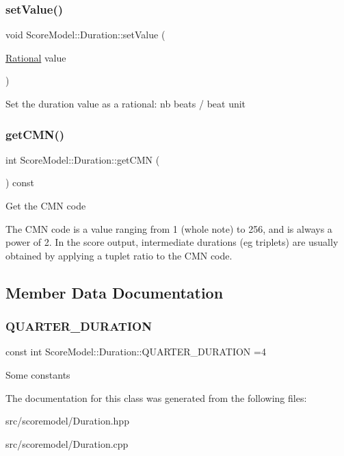 \subsubsection{\texorpdfstring{setValue()}{setValue()}}
{\footnotesize\ttfamily void Score\+Model\+::\+Duration\+::set\+Value (\begin{DoxyParamCaption}\item[{\mbox{\hyperlink{classRational}{Rational}}}]{value }\end{DoxyParamCaption})\hspace{0.3cm}{\ttfamily [inline]}}

Set the duration value as a rational\+: nb beats / beat unit \mbox{\label{classScoreModel_1_1Duration_a3c1433fd0a073dc75d529f18257c1557}} 
\subsubsection{\texorpdfstring{getCMN()}{getCMN()}}
{\footnotesize\ttfamily int Score\+Model\+::\+Duration\+::get\+C\+MN (\begin{DoxyParamCaption}{ }\end{DoxyParamCaption}) const}

Get the C\+MN code

The C\+MN code is a value ranging from 1 (whole note) to 256, and is always a power of 2. In the score output, intermediate durations (eg triplets) are usually obtained by applying a tuplet ratio to the C\+MN code. 

\subsection{Member Data Documentation}
\mbox{\label{classScoreModel_1_1Duration_ae897ce15da38ac887ddba0cf769c5ad7}} 
\subsubsection{\texorpdfstring{QUARTER\_DURATION}{QUARTER\_DURATION}}
{\footnotesize\ttfamily const int Score\+Model\+::\+Duration\+::\+Q\+U\+A\+R\+T\+E\+R\+\_\+\+D\+U\+R\+A\+T\+I\+ON =4\hspace{0.3cm}{\ttfamily [static]}}

Some constants 

The documentation for this class was generated from the following files\+:\begin{DoxyCompactItemize}
\item 
src/scoremodel/Duration.\+hpp\item 
src/scoremodel/Duration.\+cpp\end{DoxyCompactItemize}

